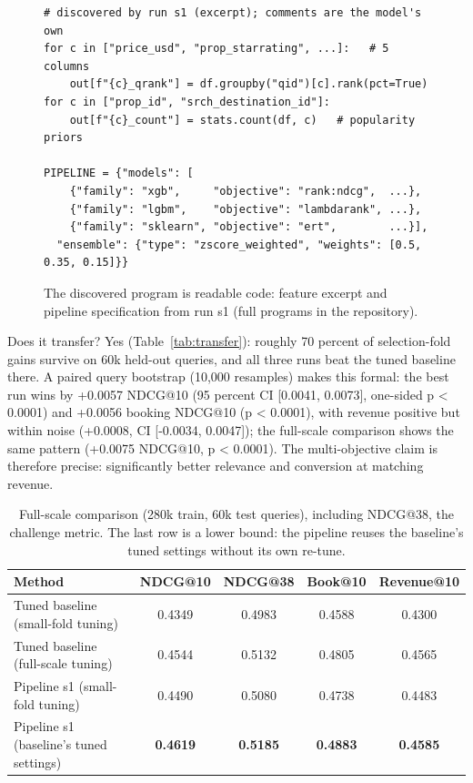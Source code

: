 \documentclass[]{ceurart}
\begin{document}
\begin{figure}
\footnotesize
\begin{verbatim}
# discovered by run s1 (excerpt); comments are the model's own
for c in ["price_usd", "prop_starrating", ...]:   # 5 columns
    out[f"{c}_qrank"] = df.groupby("qid")[c].rank(pct=True)
for c in ["prop_id", "srch_destination_id"]:
    out[f"{c}_count"] = stats.count(df, c)   # popularity priors

PIPELINE = {"models": [
    {"family": "xgb",     "objective": "rank:ndcg",  ...},
    {"family": "lgbm",    "objective": "lambdarank", ...},
    {"family": "sklearn", "objective": "ert",        ...}],
  "ensemble": {"type": "zscore_weighted", "weights": [0.5, 0.35, 0.15]}}
\end{verbatim}
\caption{The discovered program is readable code: feature excerpt and
pipeline specification from run s1 (full programs in the repository).}
\label{fig:discovered}
\end{figure}

Does it transfer? Yes (Table~\ref{tab:transfer}): roughly 70 percent of
selection-fold gains survive on 60k held-out queries, and all three runs
beat the tuned baseline there. A paired query bootstrap (10,000 resamples) makes
this formal: the best run wins by +0.0057 NDCG@10 (95 percent CI [0.0041,
0.0073], one-sided p < 0.0001) and +0.0056 booking NDCG@10 (p < 0.0001),
with revenue positive but within noise (+0.0008, CI [-0.0034, 0.0047]); the
full-scale comparison shows the same pattern (+0.0075 NDCG@10, p < 0.0001).
The multi-objective claim is therefore precise: significantly better
relevance and conversion at matching revenue.

\begin{table}
  \caption{Full-scale comparison (280k train, 60k test queries), including
  NDCG@38, the challenge metric. The last row is a lower bound: the
  pipeline reuses the baseline's tuned settings without its own re-tune.}
  \label{tab:fullscale}
  \begin{tabular}{lcccc}
    \toprule
    Method & NDCG@10 & NDCG@38 & Book@10 & Revenue@10 \\
    \midrule
    Tuned baseline (small-fold tuning) & 0.4349 & 0.4983 & 0.4588 & 0.4300 \\
    Tuned baseline (full-scale tuning) & 0.4544 & 0.5132 & 0.4805 & 0.4565 \\
    Pipeline s1 (small-fold tuning) & 0.4490 & 0.5080 & 0.4738 & 0.4483 \\
    Pipeline s1 (baseline's tuned settings) & \textbf{0.4619} & \textbf{0.5185} & \textbf{0.4883} & \textbf{0.4585} \\
    \bottomrule
  \end{tabular}
\end{table}
\end{document}
